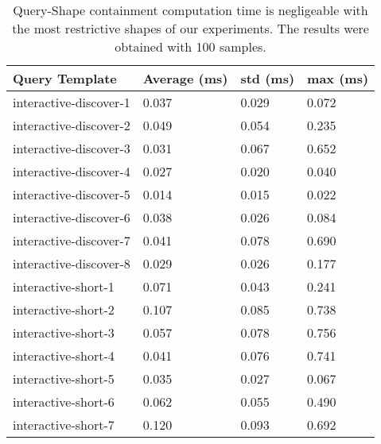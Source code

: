 \begin{table}
	\begin{center}
		\begin{tabular}{|l|l|l|l|}
			\hline
			Query Template & Average (ms) & std (ms) & max (ms) \\
			\hline
			interactive-discover-1 & 0.037 & 0.029 & 0.072 \\
			\hline
			interactive-discover-2 & 0.049 & 0.054 & 0.235 \\
			\hline
			interactive-discover-3 & 0.031 & 0.067 & 0.652 \\
			\hline
			interactive-discover-4 & 0.027 & 0.020 & 0.040 \\
			\hline
			interactive-discover-5 & 0.014 & 0.015 & 0.022 \\
			\hline
			interactive-discover-6 & 0.038 & 0.026 & 0.084 \\
			\hline
			interactive-discover-7 & 0.041 & 0.078 & 0.690 \\
			\hline
			interactive-discover-8 & 0.029 & 0.026 & 0.177 \\
			\hline
			interactive-short-1 & 0.071 & 0.043 & 0.241 \\
			\hline
			interactive-short-2 & 0.107 & 0.085 & 0.738 \\
			\hline
			interactive-short-3 & 0.057 & 0.078 & 0.756 \\
			\hline
			interactive-short-4 & 0.041 & 0.076 & 0.741 \\
			\hline
			interactive-short-5 & 0.035 & 0.027 & 0.067 \\
			\hline
			interactive-short-6 & 0.062 & 0.055 & 0.490 \\
			\hline
			interactive-short-7 & 0.120 & 0.093 & 0.692 \\
			\hline
		\end{tabular}
	\end{center}
	\caption{Query-Shape containment computation time is negligeable with the most restrictive shapes of our experiments. The results were obtained with 100 samples.}
	\label{tab:queryShapeContainmentEval}
\end{table}